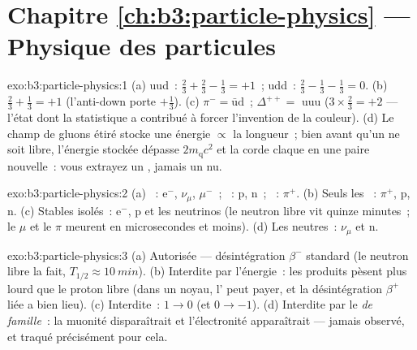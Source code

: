 \section*{Chapitre \ref{ch:b3:particle-physics} --- Physique des particules}

\begin{solution}{exo:b3:particle-physics:1}
(a) uud~: $\tfrac23 + \tfrac23 - \tfrac13 = +1$~; udd~: $\tfrac23 -
\tfrac13 - \tfrac13 = 0$. (b) $\tfrac23 + \tfrac13 = +1$
(l'anti-down porte $+\tfrac13$). (c) $\pi^- =
\bar{\text{u}}\text{d}$~; $\Delta^{++} = $ uuu ($3\times\tfrac23 =
+2$ --- l'état dont la statistique a contribué à forcer l'invention
de la couleur). (d) Le champ de gluons étiré stocke une énergie
$\propto$ la longueur~; bien avant qu'un  ne soit libre,
l'énergie stockée dépasse $2m_{\text{q}}c^2$ et la corde claque en
une paire nouvelle~: vous extrayez un , jamais un  nu.
\end{solution}

\begin{solution}{exo:b3:particle-physics:2}
(a) ~: e$^-$, $\nu_\mu$, $\mu^-$~; ~: p, n~; ~:
$\pi^+$. (b) Seuls les ~: $\pi^+$, p, n. (c) Stables isolés~:
e$^-$, p et les neutrinos (le neutron libre vit quinze minutes~; le
$\mu$ et le $\pi$ meurent en microsecondes et moins). (d) Les
neutres~: $\nu_\mu$ et n.
\end{solution}

\begin{solution}{exo:b3:particle-physics:3}
(a) Autorisée --- désintégration $\beta^-$ standard (le neutron
libre la fait, $T_{1/2} \approx \qty{10}{min}$). (b) Interdite par
l'énergie~: les produits pèsent plus lourd que le proton libre (dans
un noyau, l' peut payer, et la désintégration
$\beta^+$ liée a bien lieu). (c) Interdite~: 
$1 \to 0$ (et  $0 \to -1$). (d) Interdite par le
 \emph{de famille}~: la muonité disparaîtrait et
l'électronité apparaîtrait --- jamais observé, et traqué
précisément pour cela.
\end{solution}

